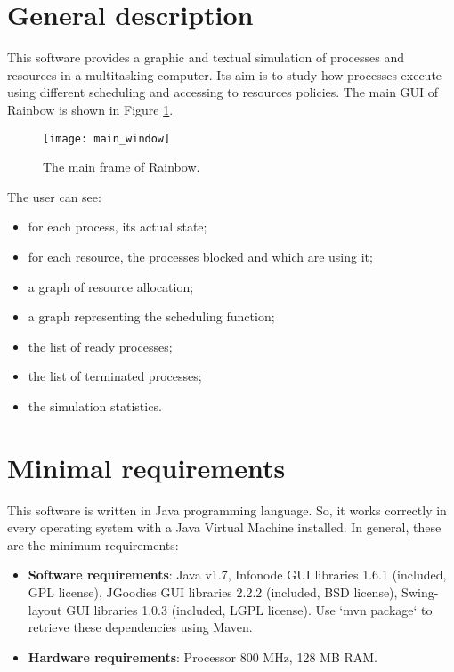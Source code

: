 \documentclass[10pt,a4paper,twoside,titlepage]{article}
\begin{document}
\section{General description}
\label{sec:general_description}
This software provides a graphic and textual simulation of processes and resources in a multitasking computer. Its aim is to study how processes execute using different scheduling and accessing to resources policies. The main GUI of Rainbow is shown in Figure \ref{fig:main_window}. 
\begin{figure}[tb]
	\begin{center}
		\texttt{[image: main\_window]}
		\caption[The main frame of Rainbow]{The main frame of Rainbow.}
		\label{fig:main_window}
	\end{center}
\end{figure}
The user can see: \\
\begin{itemize}
 \item for each process, its actual state;
 \item for each resource, the processes blocked and which are using it;
 \item a graph of resource allocation;
 \item a graph representing the scheduling function;
 \item the list of ready processes;
 \item the list of terminated processes;
 \item the simulation statistics.
\end{itemize}



\section{Minimal requirements}
\label{sec:minimal_requirements}
This software is written in Java programming language. So, it works correctly in every operating system with a Java Virtual Machine installed. In general, these are the minimum requirements:
\begin{itemize}
 \item \textbf{Software requirements}: Java v1.7, Infonode GUI libraries 1.6.1 (included, GPL license), JGoodies GUI libraries 2.2.2 (included, BSD license), Swing-layout GUI libraries 1.0.3 (included, LGPL license). Use `mvn package` to retrieve these dependencies using Maven.
 \item \textbf{Hardware requirements}: Processor 800 MHz, 128 MB RAM. 
\end{itemize}
\end{document}
